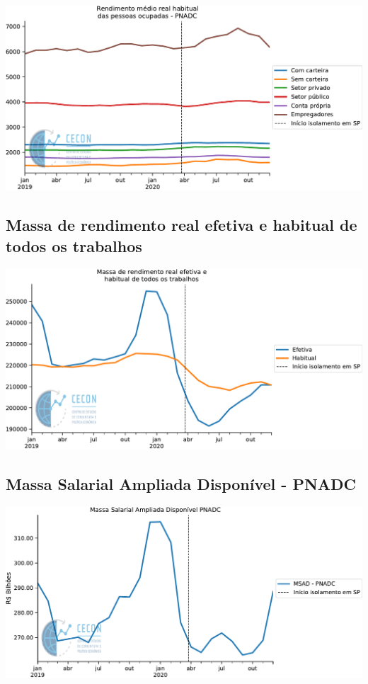 \documentclass{SelfArx}
\begin{document}
\begin{center}
\includegraphics[width=.9\linewidth]{./figs/Emprego/RMHPO.pdf}
\end{center}

\subsection*{Massa de rendimento real efetiva e habitual de todos os trabalhos}
\label{sec:orgbaf774e}

\begin{center}
\includegraphics[width=.9\linewidth]{./figs/Emprego/MRR_Efetiva_Habitual.pdf}
\end{center}

\subsection*{Massa Salarial Ampliada Disponível - PNADC}
\label{sec:orgd3a9c91}

\begin{center}
\includegraphics[width=.9\linewidth]{./figs/Emprego/MSAD.pdf}
\end{center}
\end{document}
